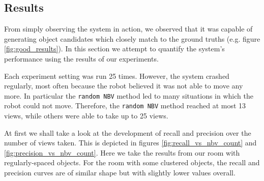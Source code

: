 \documentclass[a4paper,11pt,english]{article}
\begin{document}
\subsection{Results}
From simply observing the system in action, we observed that it was capable of generating object candidates which closely match to the ground truths (e.g. figure \ref{fig:good_results}).
In this section we attempt to quantify the system's performance using the results of our experiments.

Each experiment setting was run \num{25} times.
However, the system crashed regularly, most often because the robot believed it was not able to move any more.
In particular the \texttt{random NBV} method led to many situations in which the robot could not move.
Therefore, the \texttt{random NBV} method reached at most \num{13} views, while others were able to take up to \num{25} views.

At first we shall take a look at the development of recall and precision over the number of views taken.
This is depicted in figures \ref{fig:recall_vs_nbv_count} and \ref{fig:precision_vs_nbv_count}.
Here we take the results from our room with regularly-spaced objects.
For the room with some clustered objects, the recall and precision curves are of similar shape but with slightly lower values overall.
\end{document}
